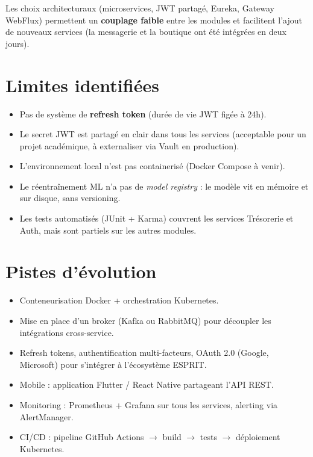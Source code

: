 \documentclass[11pt,a4paper]{report}
\begin{document}
Les choix architecturaux (microservices, JWT partagé, Eureka, Gateway WebFlux)
permettent un \textbf{couplage faible} entre les modules et facilitent
l'ajout de nouveaux services (la messagerie et la boutique ont été intégrées
en deux jours).

\section{Limites identifiées}
\begin{itemize}
  \item Pas de système de \textbf{refresh token} (durée de vie JWT figée à 24h).
  \item Le secret JWT est partagé en clair dans tous les services
        (acceptable pour un projet académique, à externaliser via Vault en
        production).
  \item L'environnement local n'est pas containerisé (Docker Compose à venir).
  \item Le réentraînement ML n'a pas de \textit{model registry} : le modèle vit
        en mémoire et sur disque, sans versioning.
  \item Les tests automatisés (JUnit + Karma) couvrent les services Trésorerie
        et Auth, mais sont partiels sur les autres modules.
\end{itemize}

\section{Pistes d'évolution}
\begin{itemize}
  \item Conteneurisation Docker + orchestration Kubernetes.
  \item Mise en place d'un broker (Kafka ou RabbitMQ) pour découpler les
        intégrations cross-service.
  \item Refresh tokens, authentification multi-facteurs, OAuth 2.0 (Google,
        Microsoft) pour s'intégrer à l'écosystème ESPRIT.
  \item Mobile : application Flutter / React Native partageant l'API REST.
  \item Monitoring : Prometheus + Grafana sur tous les services, alerting via
        AlertManager.
  \item CI/CD : pipeline GitHub Actions \(\rightarrow\) build \(\rightarrow\)
        tests \(\rightarrow\) déploiement Kubernetes.
\end{itemize}
\end{document}
